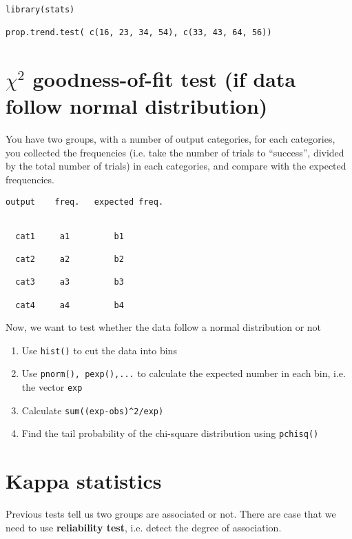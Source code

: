 \begin{lstlisting}
library(stats)

prop.trend.test( c(16, 23, 34, 54), c(33, 43, 64, 56))
\end{lstlisting}

\section[Chi-square goodness-of-fit test ]{$\chi^2$ goodness-of-fit test (if
data follow normal distribution)}
\label{sec:chi2-goodness-fit}


You have two groups, with a number of output categories, for each
categories, you collected the frequencies (i.e. take the number of
trials to ``success'', divided by the total number of trials) in each
categories, and compare with the expected frequencies. 
\begin{verbatim}             
output    freq.   expected freq.


  cat1     a1         b1

  cat2     a2         b2

  cat3     a3         b3

  cat4     a4         b4
\end{verbatim}
Now, we want to test whether the data follow a normal distribution or not
\begin{enumerate}
\item Use \verb!hist()! to cut the data into bins
\item Use \verb!pnorm(), pexp(),...! to calculate the expected number
  in each bin, i.e. the vector \verb!exp!
\item Calculate \verb!sum((exp-obs)^2/exp)!
\item Find the tail probability of the chi-square distribution using
  \verb!pchisq()!
\end{enumerate}


\section{Kappa statistics}
\label{sec:kappa-statistics}

Previous tests tell us two groups are associated or not. There are
case that we need to use {\bf reliability test}, i.e. detect the
degree of association.

